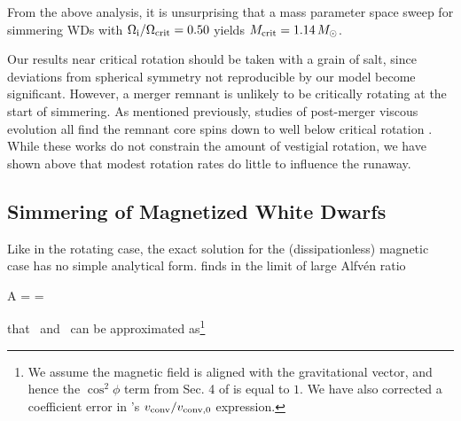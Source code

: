 
From the above analysis, it is unsurprising that a mass parameter space sweep for simmering WDs with $\Ominit/\Omcrit = 0.50$ yields $\Mcrit = 1.14\,\Msun$.  


Our results near critical rotation should be taken with a grain of salt, since deviations from spherical symmetry not reproducible by our model become significant. However, a merger remnant is unlikely to be critically rotating at the start of simmering.  As mentioned previously, studies of post-merger viscous evolution all find the remnant core spins down to well below critical rotation \citep{shen+12,schw+12,ji+13}.  While these works do not constrain the amount of vestigial rotation, we have shown above that modest rotation rates do little to influence the runaway.

\subsection{Simmering of Magnetized White Dwarfs}
\label{ssec:c5_runaway_mhd}

Like in the rotating case, the exact solution for the (dissipationless) magnetic case has no simple analytical form.  \citeal{stev79} finds in the limit of large Alfv\'{e}n ratio

\eqbegin
A =  = 
\label{eq:c5_alfven_ratio}
\eqend

\noindent that \dnabmag\ and \vconv\ can be approximated as\footnote{We assume the magnetic field is aligned with the gravitational vector, and hence the $\cos^2\phi$ term from Sec. 4 of \citeal{stev79} is equal to $1$.  We have also corrected a coefficient error in \citeal{stev79}'s $\vconv/\vconvzero$ expression.}


